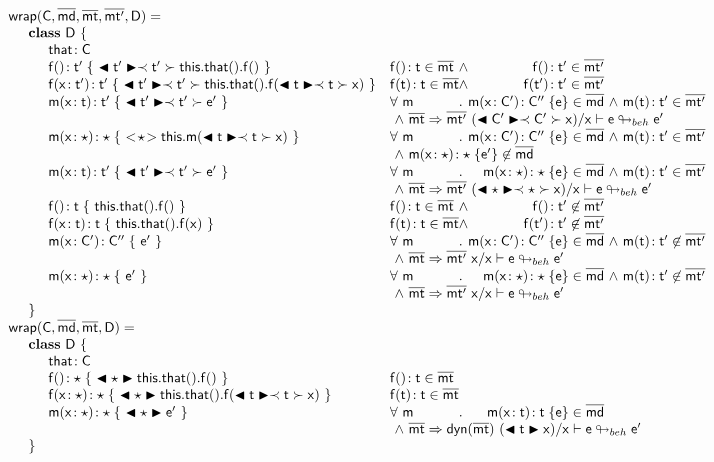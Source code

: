 \documentclass[a4paper,USenglish]{tex/lipics-v2016}
\begin{document}
\[\begin{array}{@{}ll@{}l@{}r@{~}c@{~}r}
    \wrap\C{\b\md}\bmt\bmtp\D = \\
\SP \class ~\D ~ \{\\
\SPP \Fdef\that\C \\
\SPP \Mdefz\f{\tp}{~\bscast\tp{\Get{\Get\this\that}\f}~}
&    \Mtype\f{}\t\in\bmt &\wedge& \Mtype\f{}\tp \in \bmtp
\\
\SPP \Mdef\f\x\tp\tp {~\bscast\tp{\Set{\Get\this\that}\f{\bscast\t\x}}~}
&    \Mtype\f\t\t \in \bmt &\wedge& \Mtype\f\tp\tp \in \bmtp
\\
\SPP \Mdef\m\x\t\tp {~\bscast\tp{{\ep}}~}
&     \All \m \Mdef\m\x\Cp\Cpp\e\in\b\md &\wedge& \Mtype\m\t\tp\in\bmtp \\
&\multicolumn{5}{l}{~\wedge~\rtranst{\bmt}\bmtp{(\bscast\Cp\x)}\x{\e}{\ep}}
\\
\SPP \Mdef\m\x\any\any {~\SubCast\any{\Call\this\m{\bscast{\t}\x}}~}
&     \All \m \Mdef\m\x\Cp\Cpp\e\in\b\md &\wedge& \Mtype\m\t\tp\in\bmtp\\
&\multicolumn{5}{l}{~\wedge~\Mdef\m\x\any\any{\e'}\not\in\b\md}
\\
\SPP \Mdef\m\x\t\tp{~\bscast\tp{\ep}~}
&    \All \m \Mdef\m\x\any\any\e\in\b\md &\wedge& \Mtype\m\t\tp\in\bmtp \\
&\multicolumn{5}{l}{~\wedge~\rtranst{\bmt}\bmtp{(\bscast\any\x)}\x\e{\ep}}
\\
\SPP \Mdefz\f\t { ~\Get{\Get\this\that}\f~}
&    \Mtype\f{}\t \in \bmt &\wedge& \Mtype\f{}\tp \not\in \bmtp
\\
\SPP \Mdef\f\x\t\t { ~\Set{\Get\this\that}\f\x~}
&    \Mtype\f\t\t \in \bmt&\wedge& \Mtype\f\tp\tp \not\in \bmtp
\\
\SPP \Mdef\m\x{\Cp}{\Cpp} {~\ep~}
&    \All \m  \Mdef\m\x\Cp\Cpp\e\in\b\md &\wedge& \Mtype\m\t\tp\not\in \bmtp \\
&\multicolumn{5}{l}{~\wedge~\rtranst{\bmt}\bmtp\x\x{\e}{\ep}}
\\
\SPP \Mdef\m\x\any\any {~\ep~}
&    \All \m  \Mdef\m\x\any\any\e\in\b\md  &\wedge& \Mtype\m\t\tp\not\in\bmtp \\
&\multicolumn{5}{l}{~\wedge~\rtranst{\bmt}\bmtp\x\x{\e}{\ep}}
\\
\SP \}
\\
\wrapAny\C\bmd\bmt\D = \\
\SP \class~\D~\{\\
\SPP \Fdef \that \C\\ 
\SPP   \Mdefz\f\any{~\BehCast\any{\Get{{\Get\this\that}}\f}~}
&  \Mtype\f{}\t \in \bmt\\
\SPP   \Mdef\f\x\any\any{~\BehCast\any{\Set{\Get\this\that}\f{\bscast\t\x}}~}
&  \Mtype\f\t\t \in \bmt\\
\SPP   \Mdef\m\x\any\any {~\BehCast\any{{\ep}}~}
&  \All \m \Mdef\m\x\t\t\e\in\b\md \\
&\multicolumn{5}{l}{~\wedge~\rtranst{\bmt}{\dyn{\bmt}}{(\BehCast\t\x)}\x{\e}{\ep}}
\\
\SP \}\\
\end{array}\]
\end{document}
